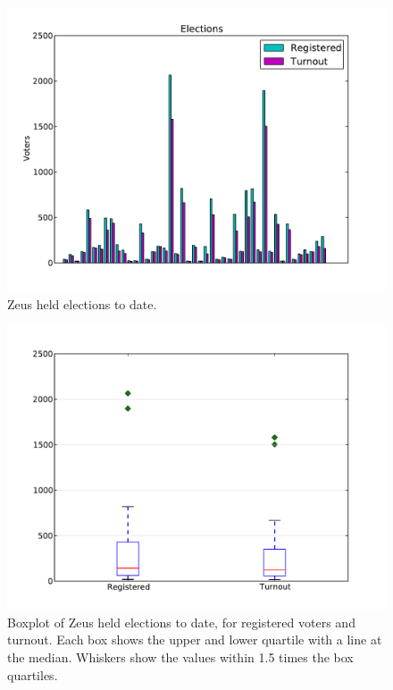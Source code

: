 \documentclass[letterpaper,10pt]{article}
\begin{document}
\begin{figure}[ht]
  \begin{center}
    \includegraphics[scale=0.7]{elections_to_date.pdf}
  \end{center}
  \caption{Zeus held elections to date.}
  \label{fig:elections_to_date}
\end{figure}

\begin{figure}[ht]
  \begin{center}
    \includegraphics[scale=0.7]{elections_to_date_boxplot.pdf}
  \end{center}
  \caption{Boxplot of Zeus held elections to date, for registered
    voters and turnout. Each box shows the upper and
    lower quartile with a line at the median. Whiskers show the values
    within 1.5 times the box quartiles.}
  \label{fig:elections_to_date_boxplot}
\end{figure}
\end{document}
